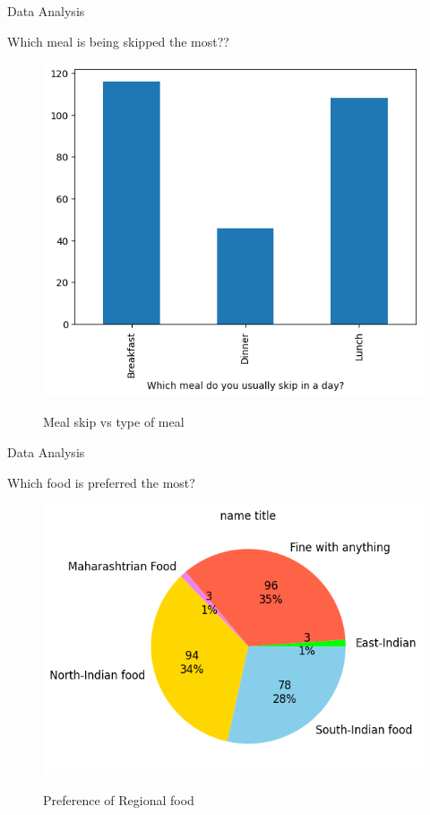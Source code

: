 \documentclass{beamer}
\begin{document}
\begin{frame}{Data Analysis}
\begin{block}{Which meal is being skipped the most??}
\begin{figure}
      \centering
    \caption{Meal skip vs type of meal }
    \includegraphics[scale = 0.55]{bar_timing_skip.png}  
    \label{bar_timing_skip}
\end{figure}
\end{block}
\end{frame}
\begin{frame}{Data Analysis}
\begin{block}{Which food is preferred the most?}
\begin{figure}
      \centering
    \caption{ Preference of Regional food}
    \includegraphics[scale = 0.55]{pie_food_pref.png}  
    \label{pie_food_pref}
\end{figure}
\end{block}
\end{frame}
\end{document}
